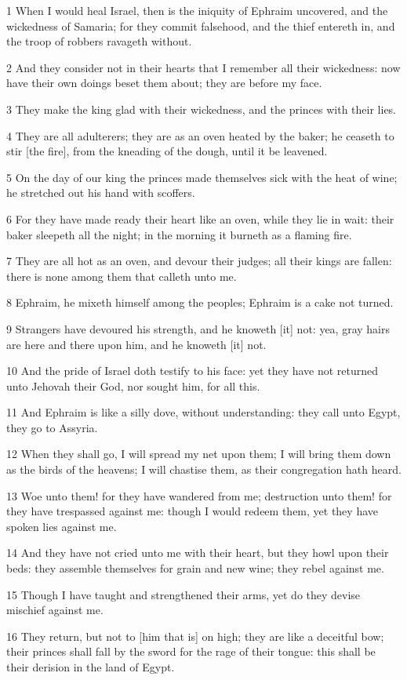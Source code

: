 \par 1 When I would heal Israel, then is the iniquity of Ephraim uncovered, and the wickedness of Samaria; for they commit falsehood, and the thief entereth in, and the troop of robbers ravageth without.
\par 2 And they consider not in their hearts that I remember all their wickedness: now have their own doings beset them about; they are before my face.
\par 3 They make the king glad with their wickedness, and the princes with their lies.
\par 4 They are all adulterers; they are as an oven heated by the baker; he ceaseth to stir [the fire], from the kneading of the dough, until it be leavened.
\par 5 On the day of our king the princes made themselves sick with the heat of wine; he stretched out his hand with scoffers.
\par 6 For they have made ready their heart like an oven, while they lie in wait: their baker sleepeth all the night; in the morning it burneth as a flaming fire.
\par 7 They are all hot as an oven, and devour their judges; all their kings are fallen: there is none among them that calleth unto me.
\par 8 Ephraim, he mixeth himself among the peoples; Ephraim is a cake not turned.
\par 9 Strangers have devoured his strength, and he knoweth [it] not: yea, gray hairs are here and there upon him, and he knoweth [it] not.
\par 10 And the pride of Israel doth testify to his face: yet they have not returned unto Jehovah their God, nor sought him, for all this.
\par 11 And Ephraim is like a silly dove, without understanding: they call unto Egypt, they go to Assyria.
\par 12 When they shall go, I will spread my net upon them; I will bring them down as the birds of the heavens; I will chastise them, as their congregation hath heard.
\par 13 Woe unto them! for they have wandered from me; destruction unto them! for they have trespassed against me: though I would redeem them, yet they have spoken lies against me.
\par 14 And they have not cried unto me with their heart, but they howl upon their beds: they assemble themselves for grain and new wine; they rebel against me.
\par 15 Though I have taught and strengthened their arms, yet do they devise mischief against me.
\par 16 They return, but not to [him that is] on high; they are like a deceitful bow; their princes shall fall by the sword for the rage of their tongue: this shall be their derision in the land of Egypt.

